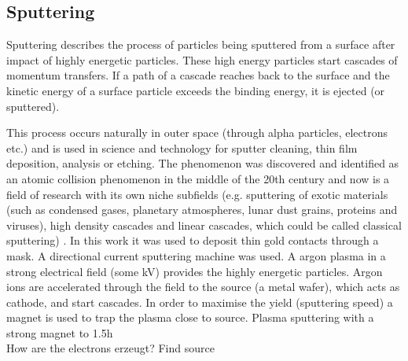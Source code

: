 \subsection{Sputtering}
Sputtering describes the process of particles being sputtered from a surface after 
impact of highly energetic particles.
These high energy particles start cascades of momentum transfers. 
If a path of a cascade reaches back to the surface and the kinetic energy of a surface 
particle exceeds the binding energy, it is ejected (or sputtered).

This process occurs naturally in outer space (through alpha particles, electrons etc.) 
and is used in science and technology for 
sputter cleaning, thin film deposition, analysis or etching. 
The phenomenon was discovered and identified as an atomic collision phenomenon in the 
middle of the 20th century and now is a field of research with its own niche subfields 
(e.g. sputtering of exotic materials (such as condensed gases, planetary
atmospheres, lunar dust grains, proteins and viruses), high density cascades and 
linear cascades, which could be called classical sputtering)
\cite{Sigmund1987}.
%
In this work it was used to deposit thin gold contacts through a mask. 
A directional current sputtering machine was used. 
A argon plasma in a strong electrical field (some kV) provides the highly energetic particles. 
Argon ions are accelerated through the field to the source (a metal wafer), which acts as cathode, and start cascades. 
In order to maximise the yield (sputtering speed) a magnet is used to trap the plasma close to source. 
Plasma sputtering with a strong magnet to 
1.5h 
\\
How are the electrons erzeugt? 
Find source\\\\

